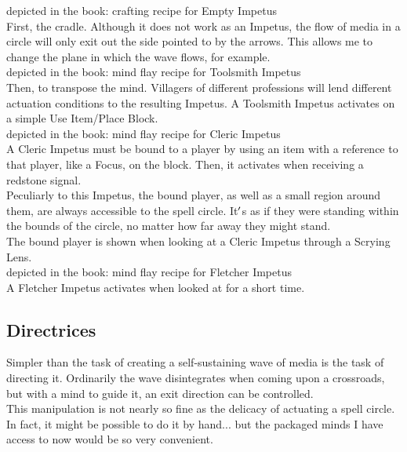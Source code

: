 \documentclass[12pt]{article}
\begin{document}
  
  depicted in the book: crafting recipe for 
    Empty Impetus
\\

      First, the cradle. Although it does not work as an Impetus, the flow of media in a circle will only exit out the side pointed to by the arrows. This allows me to change the plane in which the wave flows, for example.\\



    depicted in the book: mind flay recipe for Toolsmith Impetus\\
  
  Then, to transpose the mind. Villagers of different professions will lend different actuation conditions to the resulting Impetus. A Toolsmith Impetus activates on a simple Use Item/Place Block.\\


    depicted in the book: mind flay recipe for Cleric Impetus\\
  
  A Cleric Impetus must be bound to a player by using an item with a reference to that player, like a Focus, on the block. Then, it activates when receiving a redstone signal.\\


  
    Peculiarly to this Impetus, the bound player, as well as a small region around them, are always accessible to the spell circle. It$\rq$s as if they were standing within the bounds of the circle, no matter how far away they might stand.\\The bound player is shown when looking at a Cleric Impetus through a Scrying Lens.\\


    depicted in the book: mind flay recipe for Fletcher Impetus\\
  
  A Fletcher Impetus activates when looked at for a short time.\\

\newpage

\label{sec:greatwork/directrix}
\subsection*{Directrices}


  
    Simpler than the task of creating a self-sustaining wave of media is the task of directing it. Ordinarily the wave disintegrates when coming upon a crossroads, but with a mind to guide it, an exit direction can be controlled.\\This manipulation is not nearly so fine as the delicacy of actuating a spell circle. In fact, it might be possible to do it by hand... but the packaged minds I have access to now would be so very convenient.\\
\end{document}
